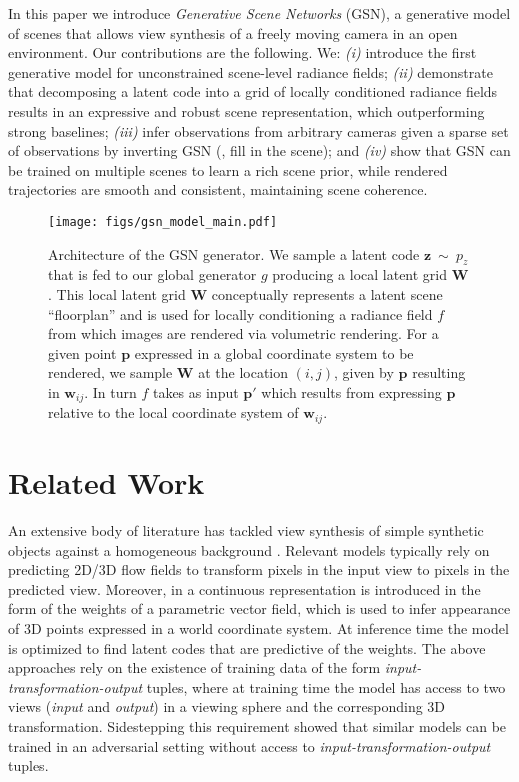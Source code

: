 \documentclass[10pt,twocolumn,letterpaper]{article}
\begin{document}
In this paper we introduce \textit{Generative Scene Networks} (GSN), a generative model of scenes that allows view synthesis of a freely moving camera in an open environment. Our contributions are the following. We: \textit{(i)} introduce the first generative model for unconstrained scene-level radiance fields; \textit{(ii)} demonstrate that decomposing a latent code into a grid of locally conditioned radiance fields results in an expressive and robust scene representation, which outperforming strong baselines; \textit{(iii)} infer observations from arbitrary cameras given a sparse set of observations by inverting GSN (\ie, fill in the scene); and \textit{(iv)} show that GSN can be trained on multiple scenes to learn a rich scene prior, while rendered trajectories are smooth and consistent, maintaining scene coherence.

\begin{figure*}[t]
    \centering
    \texttt{[image: figs/gsn\_model\_main.pdf]}
    \caption{Architecture of the GSN generator. We sample a latent code $\textbf{z}~\sim~p_z$ that is fed to our global generator $g$ producing a local latent grid $\textbf{W}$. This local latent grid $\textbf{W}$ conceptually represents a latent scene ``floorplan'' and is used for locally conditioning a radiance field $f$ from which images are rendered via volumetric rendering. For a given point $\textbf{p}$ expressed in a global coordinate system to be rendered, we sample $\textbf{W}$ at the location $(i, j)$, given by $\textbf{p}$ resulting in $\textbf{w}_{ij}$. In turn $f$ takes as input $\textbf{p}'$ which results from expressing $\textbf{p}$ relative to the local coordinate system of $\textbf{w}_{ij}$.}
    \label{fig:gsn_model}
\end{figure*}

\section{Related Work}

An extensive body of literature has tackled view synthesis of simple synthetic objects \cite{shapenet} against a homogeneous background \cite{enr,tbn,gaf,multiview2novelview,appearanceflow}. Relevant models typically rely on predicting 2D/3D flow fields to transform pixels in the input view to pixels in the predicted view. Moreover, in \cite{srn} a continuous representation is introduced in the form of the weights of a parametric vector field, which is used to infer appearance of 3D points expressed in a world coordinate system. At inference time the model is optimized to find latent codes that are predictive of the weights. The above approaches rely on the existence of training data of the form \textit{input-transformation-output} tuples, where at training time the model has access to two views (\textit{input} and \textit{output}) in a viewing sphere and the corresponding 3D transformation. Sidestepping this requirement \cite{platonicgan,hologan} showed that similar models can be trained in an adversarial setting without access to \textit{input-transformation-output} tuples.
\end{document}
